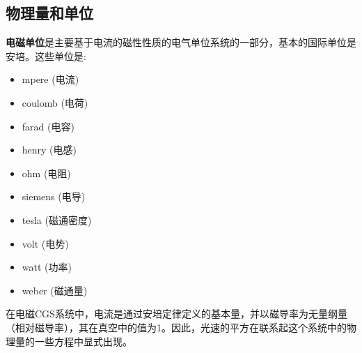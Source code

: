 \subsection{ 物理量和单位}
\textbf{电磁单位}是主要基于电流的磁性性质的电气单位系统的一部分，基本的国际单位是安培。这些单位是:
\begin{itemize}
\item mpere (电流)
\item coulomb (电荷)
\item farad (电容)
\item henry (电感)
\item ohm (电阻)
\item siemens (电导)
\item tesla (磁通密度)
\item volt (电势)
\item watt (功率)
\item weber (磁通量)
\end{itemize}
在电磁CGS系统中，电流是通过安培定律定义的基本量，并以磁导率为无量纲量（相对磁导率），其在真空中的值为1。因此，光速的平方在联系起这个系统中的物理量的一些方程中显式出现。
